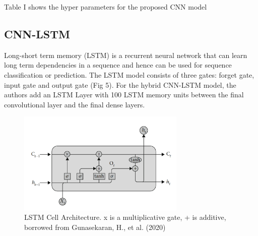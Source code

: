 \documentclass[journal]{IEEEtran}
\begin{document}
Table I shows the hyper parameters for the proposed CNN model
\begin{table}
  \caption{\label{tab:table-name}Hyper parameters of CNN model}
  \centering
\end{table}

\subsection{CNN-LSTM}
Long-short term memory (LSTM) is a recurrent neural network that can learn long term dependencies in a sequence and 
hence can be used for sequence classification or prediction. The LSTM model consists of three gates: forget gate, input gate and output gate (Fig 5).
For the hybrid CNN-LSTM model, the authors add an LSTM Layer with 100 LSTM memory units
between the final convolutional layer and the final dense layers.
 
\begin{figure}
  \centering
  \includegraphics[width=8cm]{figures/lstm_cell.png}
  \caption{LSTM Cell Architecture. x is a multiplicative gate, + is additive, borrowed from Gunasekaran, H., et al. (2020)}
\end{figure}
\end{document}
